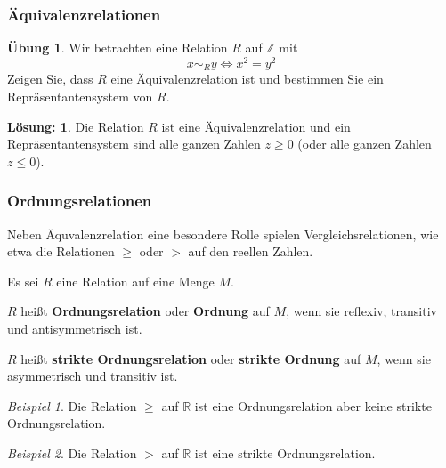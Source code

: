 \documentclass[hyperref={pdfpagelabels=false}]{beamer}
\theoremstyle{plain}%
\theoremstyle{definition}
\newtheorem*{uebung}{Übung}
\newtheorem*{sol}{Lösung:}
\theoremstyle{remark}
\newtheorem*{beispiel}{Beispiel}
\def \R{\mathbb R}
\def \Z{\mathbb Z}
\begin{document}
\begin{frame}
\frametitle{Äquivalenzrelationen}

\begin{uebung}

Wir betrachten eine Relation $R$ auf $\Z$ mit 
	$$ x \sim_R y \iff x^2 = y^2 $$
Zeigen Sie, dass $R$ eine Äquivalenzrelation ist und bestimmen Sie ein Repräsentantensystem von $R$.  
\end{uebung}

\bigbreak
\pause \pause 

\begin{sol}
Die Relation $R$ ist eine Äquivalenzrelation und ein Repräsentantensystem sind alle ganzen Zahlen $z \geq 0$ 
(oder alle ganzen Zahlen $z \leq 0$). 
\end{sol}

\end{frame}

\begin{frame}
\frametitle{Ordnungsrelationen}

Neben Äquvalenzrelation eine besondere Rolle spielen Vergleichsrelationen, wie etwa die Relationen $\geq$ 
oder $>$ auf den reellen Zahlen. 

\pause 

\begin{definition} Es sei $R$ eine Relation auf eine Menge $M$.

$R$ heißt \textbf{Ordnungsrelation} oder \textbf{Ordnung} auf $M$, wenn sie 
reflexiv, transitiv und antisymmetrisch ist.

\pause 

$R$ heißt \textbf{strikte Ordnungsrelation} oder \textbf{strikte Ordnung} 
auf $M$, wenn sie asymmetrisch und  transitiv ist.
\end{definition}

\pause 
\begin{beispiel} Die Relation $\geq$ auf $\R$ ist eine Ordnungsrelation aber keine 
strikte Ordnungsrelation.
\end{beispiel}

\pause 

\begin{beispiel} Die Relation $>$ auf $\R$ ist eine strikte Ordnungsrelation.
\end{beispiel}

\end{frame}
\end{document}
